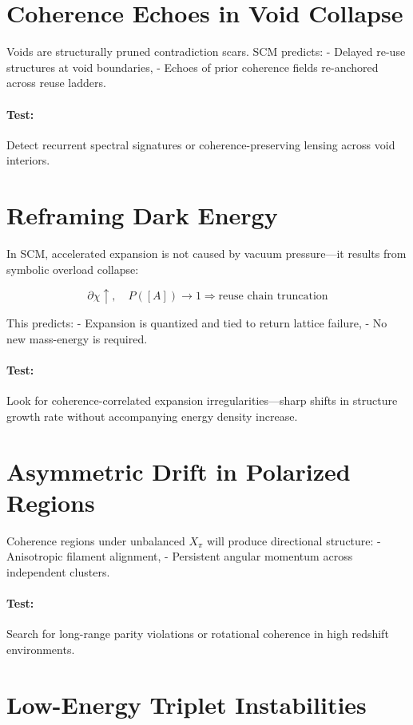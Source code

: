 \section{Coherence Echoes in Void Collapse}

Voids are structurally pruned contradiction scars. SCM predicts:
- Delayed re-use structures at void boundaries,
- Echoes of prior coherence fields re-anchored across reuse ladders.

\paragraph{Test:} Detect recurrent spectral signatures or coherence-preserving lensing across void interiors.

\section{Reframing Dark Energy}

In SCM, accelerated expansion is not caused by vacuum pressure—it results from symbolic overload collapse:

\[
\partial \chi \uparrow,\quad P([A]) \to 1 \Rightarrow \text{reuse chain truncation}
\]

This predicts:
- Expansion is quantized and tied to return lattice failure,
- No new mass-energy is required.

\paragraph{Test:} Look for coherence-correlated expansion irregularities—sharp shifts in structure growth rate without accompanying energy density increase.

\section{Asymmetric Drift in Polarized Regions}

Coherence regions under unbalanced $X_\pi$ will produce directional structure:
- Anisotropic filament alignment,
- Persistent angular momentum across independent clusters.

\paragraph{Test:} Search for long-range parity violations or rotational coherence in high redshift environments.

\section{Low-Energy Triplet Instabilities}

